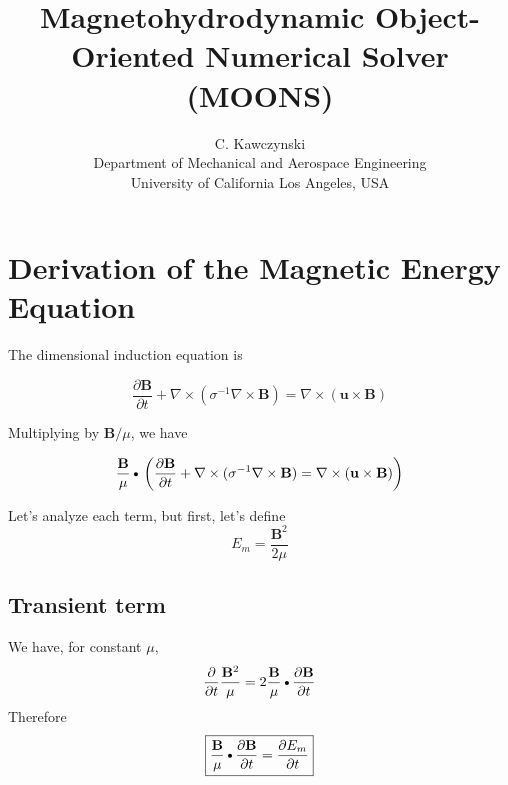 \documentclass[11pt]{article}
\newcommand{\B}{\mathbf{B}}
\newcommand{\PD}{\partial}
\newcommand{\BM}{\frac{\mathbf{B}}{\mu}}
\newcommand{\U}{\mathbf{u}}
\newcommand{\SII}{\sigma^{-1}}
\newcommand{\DOT}{\text{\textbullet}}
\begin{document}
\doublespacing
\title{Magnetohydrodynamic Object-Oriented Numerical Solver (MOONS)}
\author{C. Kawczynski \\
Department of Mechanical and Aerospace Engineering \\
University of California Los Angeles, USA\\
}
\maketitle

\section{Derivation of the Magnetic Energy Equation}
The dimensional induction equation is

\begin{equation}
	\frac{\PD \B}{\PD t} +
	\nabla \times (\SII \nabla \times \B) =
	\nabla \times (\U \times \B)
\end{equation}

Multiplying by $\B / \mu$, we have

\begin{equation}
	\BM \DOT
	\left(
	\frac{\PD \B}{\PD t} +
	\nabla \times (\SII \nabla \times \B) =
	\nabla \times (\U \times \B)
	\right)
\end{equation}

Let's analyze each term, but first, let's define
\begin{equation}
	E_m = \frac{\B^2}{2\mu}
\end{equation}

\subsection{Transient term}
We have, for constant $\mu$, 
\begin{equation}
	\frac{\PD}{\PD t} \frac{\B^2}{\mu} = 2 \BM \DOT \frac{\PD \B}{\PD t} 
\end{equation}
Therefore
\begin{equation}
	\boxed{
	\BM \DOT \frac{\PD \B}{\PD t} =
	\frac{\PD E_m}{\PD t}
	}
\end{equation}
\end{document}
